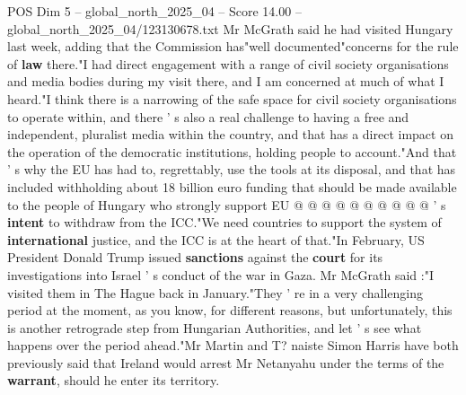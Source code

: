 \begin{textsample}{POS Dim 5 – global\_north\_2025\_04 – Score 14.00 – global\_north\_2025\_04/123130678.txt}
Mr McGrath said he had visited Hungary last week, adding that the Commission has"well documented"concerns for the rule of \textbf{law} there."I had direct engagement with a range of civil society organisations and media bodies during my visit there, and I am concerned at much of what I heard."I think there is a narrowing of the safe space for civil society organisations to operate within, and there ' s also a real challenge to having a free and independent, pluralist media within the country, and that has a direct impact on the operation of the democratic institutions, holding people to account."And that ' s why the EU has had to, regrettably, use the tools at its disposal, and that has included withholding about 18 billion euro funding that should be made available to the people of Hungary who strongly support EU @ @ @ @ @ @ @ @ @ @ ' s \textbf{intent} to withdraw from the ICC."We need countries to support the system of \textbf{international} justice, and the ICC is at the heart of that."In February, US President Donald Trump issued \textbf{sanctions} against the \textbf{court} for its investigations into Israel ' s conduct of the war in Gaza.
Mr McGrath said :"I visited them in The Hague back in January."They ' re in a very challenging period at the moment, as you know, for different reasons, but unfortunately, this is another retrograde step from Hungarian Authorities, and let ' s see what happens over the period ahead."Mr Martin and T? naiste Simon Harris have both previously said that Ireland would arrest Mr Netanyahu under the terms of the \textbf{warrant}, should he enter its territory.

\end{textsample}
